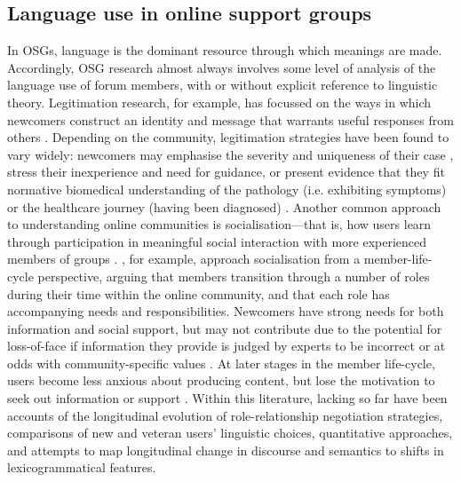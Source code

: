 \documentclass{article}
\renewcommand{\cite}{\parencite}
\begin{document}
\subsection{Language use in online support groups} \label{sect:intro-lang-in-osg}

In OSGs, language is the dominant resource through which meanings are made. Accordingly, OSG research almost always involves some level of analysis of the language use of forum members, with or without explicit reference to linguistic theory.  Legitimation research, for example, has focussed on the ways in which newcomers construct an identity and message that warrants useful responses from others \cite{galegher_legitimacy_1998,west_facework_2010}. Depending on the community, legitimation strategies have been found to vary widely: newcomers may emphasise the severity and uniqueness of their case , stress their inexperience and need for guidance, or present evidence that they fit normative biomedical understanding of the pathology (i.e. exhibiting symptoms) or the healthcare journey (having been diagnosed) \cite{varga2014grieving}. Another common approach to understanding online communities is socialisation---that is, how users learn through participation in meaningful social interaction with more experienced members of groups \cite{ochs_socialization_1991}. \textcite{lee_new_2014}, for example, approach socialisation from a member-life-cycle perspective, arguing that members transition through a number of roles during their time within the online community, and that each role has accompanying needs and responsibilities. Newcomers have strong needs for both information and social support, but may not contribute due to the potential for loss-of-face if information they provide is judged by experts to be incorrect \cite{fuller_innovation_2007} or at odds with community-specific values \cite{weber_missed_2011}. At later stages in the member life-cycle, users become less anxious about producing content, but lose the motivation to seek out information or support \cite{lee_new_2014}. Within this literature, lacking so far have been accounts of the longitudinal evolution of role-relationship negotiation strategies, comparisons of new and veteran users' linguistic choices, quantitative approaches, and attempts to map longitudinal change in discourse and semantics to shifts in lexicogrammatical features.
\end{document}
